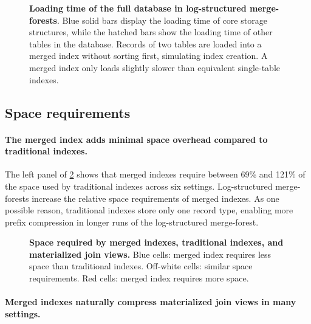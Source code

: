 \documentclass[biblatex, english]{lni}
\begin{document}
\begin{figure}[!htb]
    
    \begin{minipage}{0.48\linewidth}
        \centering
    \end{minipage}\hfill
    \begin{minipage}{0.48\linewidth}
    \caption{\textbf{Loading time of the full database in log-structured merge-forests}.
    Blue solid bars display the loading time of core storage structures, while the hatched bars show the loading time of other tables in the database.
        Records of two tables are loaded into a merged index without sorting first, simulating index creation.
        A merged index only loads slightly slower than equivalent single-table indexes.
    }\label{fig:lsm_load_time}
    \end{minipage}
\end{figure}

\subsection{Space requirements}\label{ssec:space}

\paragraph{The merged index adds minimal space overhead compared to traditional indexes.}

The left panel of \cref{fig:space_requirements} shows that merged indexes require between 69\% and 121\% of the space used by traditional indexes across six settings.
Log-structured merge-forests increase the relative space requirements of merged indexes.
As one possible reason, traditional indexes store only one record type, enabling more prefix compression in longer runs of the log-structured merge-forest.

\begin{figure}[htb]
    \centering
    \caption{
    \textbf{Space required by merged indexes, traditional indexes, and materialized join views.}
    Blue cells: merged index requires less space than traditional indexes. Off-white cells: similar space requirements. Red cells: merged index requires more space.}\label{fig:space_requirements}
\end{figure}

\paragraph{Merged indexes naturally compress materialized join views in many settings.}
\end{document}
